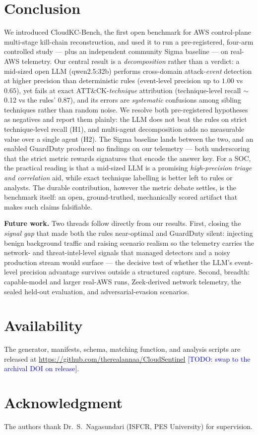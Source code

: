 \documentclass[journal]{IEEEtran}
\newcommand{\todo}[1]{\textcolor{blue}{[TODO: #1]}}
\begin{document}
\section{Conclusion}\label{sec:conclusion}
We introduced CloudKC-Bench, the first open benchmark for AWS control-plane multi-stage
kill-chain reconstruction, and used it to run a pre-registered, four-arm controlled study
--- plus an independent community Sigma baseline --- on real-AWS telemetry. Our central
result is a \emph{decomposition} rather than a verdict: a mid-sized open LLM (qwen2.5:32b)
performs cross-domain attack-\emph{event} detection at higher precision than deterministic
rules (event-level precision up to $1.00$ vs $0.65$), yet fails at exact
ATT\&CK-\emph{technique} attribution (technique-level recall $\sim$0.12 vs the rules'
$0.87$), and its errors are \emph{systematic} confusions among sibling techniques rather
than random noise. We resolve both pre-registered hypotheses as negatives and report them
plainly: the LLM does not beat the rules on strict technique-level recall (H1), and
multi-agent decomposition adds no measurable value over a single agent (H2). The Sigma
baseline lands between the two, and an enabled GuardDuty produced no findings on our
telemetry --- both underscoring that the strict metric rewards signatures that encode the
answer key. For a SOC, the practical reading is that a mid-sized LLM is a promising
\emph{high-precision triage and correlation} aid, while exact technique labelling is better
left to rules or analysts. The durable contribution, however the metric debate settles, is
the benchmark itself: an open, ground-truthed, mechanically scored artifact that makes such
claims falsifiable.

\noindent\textbf{Future work.} Two threads follow directly from our results. First, closing
the \emph{signal gap} that made both the rules near-optimal and GuardDuty silent: injecting
benign background traffic and raising scenario realism so the telemetry carries the network-
and threat-intel-level signals that managed detectors and a noisy production stream would
surface --- the decisive test of whether the LLM's event-level precision advantage survives
outside a structured capture. Second, breadth: capable-model and larger real-AWS runs,
Zeek-derived network telemetry, the sealed held-out evaluation, and adversarial-evasion
scenarios.

\section*{Availability}
The generator, manifests, schema, matching function, and analysis scripts are released at
\url{https://github.com/therealannaa/CloudSentinel} \todo{swap to the archival DOI on release}.

\section*{Acknowledgment}
The authors thank Dr.~S.~Nagasundari (ISFCR, PES University) for supervision.



\end{document}
